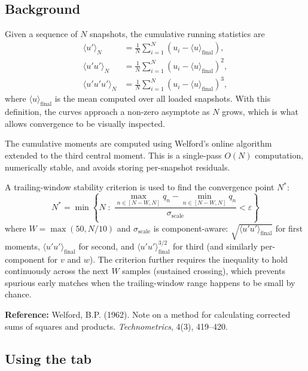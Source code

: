 \documentclass[11pt, a4paper]{report}
\begin{document}
\subsection{Background}

Given a sequence of $N$ snapshots, the cumulative running statistics are
\begin{align}
\langle u' \rangle_N      &= \frac{1}{N} \sum_{i=1}^{N} (u_i - \langle u \rangle_{\mathrm{final}}), \\
\langle u' u' \rangle_N   &= \frac{1}{N} \sum_{i=1}^{N} (u_i - \langle u \rangle_{\mathrm{final}})^2, \\
\langle u' u' u' \rangle_N &= \frac{1}{N} \sum_{i=1}^{N} (u_i - \langle u \rangle_{\mathrm{final}})^3,
\end{align}
where $\langle u \rangle_{\mathrm{final}}$ is the mean computed over all loaded snapshots. With this definition, the curves approach a non-zero asymptote as $N$ grows, which is what allows convergence to be visually inspected.

The cumulative moments are computed using Welford's online algorithm extended to the third central moment. This is a single-pass $O(N)$ computation, numerically stable, and avoids storing per-snapshot residuals.

A trailing-window stability criterion is used to find the convergence point $N^*$:
\[
N^* = \min\left\{ N \;:\; \frac{\max_{n \in [N - W, N]} q_n - \min_{n \in [N - W, N]} q_n}{\sigma_{\mathrm{scale}}} < \varepsilon \right\}
\]
where $W = \max(50, N/10)$ and $\sigma_{\mathrm{scale}}$ is component-aware: $\sqrt{\langle u'u'\rangle_{\mathrm{final}}}$ for first moments, $\langle u'u'\rangle_{\mathrm{final}}$ for second, and $\langle u'u'\rangle_{\mathrm{final}}^{3/2}$ for third (and similarly per-component for $v$ and $w$). The criterion further requires the inequality to hold continuously across the next $W$ samples (sustained crossing), which prevents spurious early matches when the trailing-window range happens to be small by chance.

\noindent\textbf{Reference:} Welford, B.P. (1962). Note on a method for calculating corrected sums of squares and products. \textit{Technometrics}, 4(3), 419--420.

\subsection{Using the tab}
\end{document}

